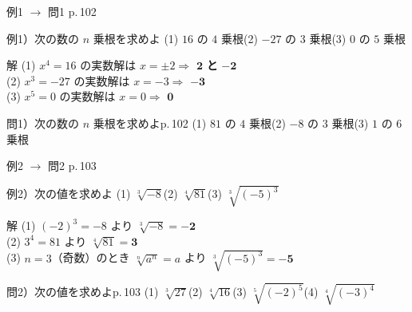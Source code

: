 \documentclass[aspectratio=43,professionalfonts,handout]{beamer}
\begin{document}
\begin{frame}{例1 $\to$ 問1 \hfill{\small p.\,102}}
  \begin{exampleblock}{例1）次の数の $n$ 乗根を求めよ}
    (1) $16$ の $4$ 乗根\quad (2) $-27$ の $3$ 乗根\quad (3) $0$ の $5$ 乗根
  \end{exampleblock}

  \begin{block}{解}
    (1)\; $x^4=16$ の実数解は $x=\pm 2$\;\;$\Rightarrow$\;\; $\boldsymbol{2}$ \textbf{と} $\boldsymbol{-2}$\\[3pt]
    (2)\; $x^3=-27$ の実数解は $x=-3$\;\;$\Rightarrow$\;\; $\boldsymbol{-3}$\\[3pt]
    (3)\; $x^5=0$ の実数解は $x=0$\;\;$\Rightarrow$\;\; $\boldsymbol{0}$
  \end{block}

  \vfill

  \begin{alertblock}{問1）次の数の $n$ 乗根を求めよ\hfill p.\,102}
    (1) $81$ の $4$ 乗根\quad (2) $-8$ の $3$ 乗根\quad (3) $1$ の $6$ 乗根
  \end{alertblock}
\end{frame}

\begin{frame}{例2 $\to$ 問2 \hfill{\small p.\,103}}
  \begin{exampleblock}{例2）次の値を求めよ}
    (1) $\sqrt[3]{-8}$\quad (2) $\sqrt[4]{81}$\quad (3) $\sqrt[3]{(-5)^3}$
  \end{exampleblock}

  \begin{block}{解}
    (1)\; $(-2)^3=-8$ より $\sqrt[3]{-8}=\boldsymbol{-2}$\\[3pt]
    (2)\; $3^4=81$ より $\sqrt[4]{81}=\boldsymbol{3}$\\[3pt]
    (3)\; $n=3$（奇数）のとき $\sqrt[n]{a^n}=a$ より $\sqrt[3]{(-5)^3}=\boldsymbol{-5}$
  \end{block}

  \vfill

  \begin{alertblock}{問2）次の値を求めよ\hfill p.\,103}
    (1) $\sqrt[3]{27}$\quad (2) $\sqrt[4]{16}$\quad (3) $\sqrt[5]{(-2)^5}$\quad (4) $\sqrt[4]{(-3)^4}$
  \end{alertblock}
\end{frame}
\end{document}
